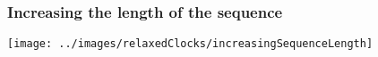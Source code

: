 \begin{frame}
\frametitle{Increasing the length of the sequence}

\begin{centering}

\texttt{[image: ../images/relaxedClocks/increasingSequenceLength]}

\end{centering}

\end{frame}